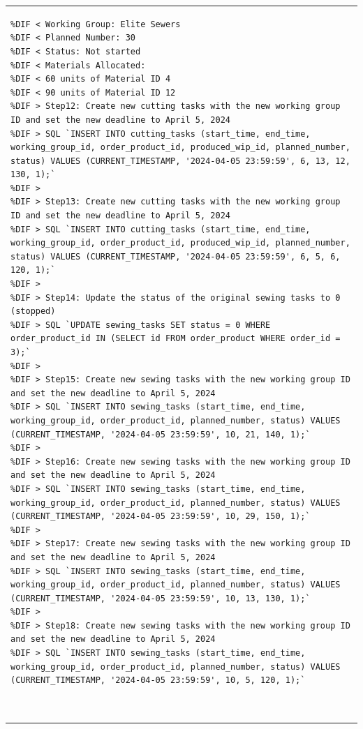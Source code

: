 \documentclass[preprint,12pt]{elsarticle}
\providecommand{\DIFmodbegin}{} %
\providecommand{\DIFmodend}{} %
\begin{document}
\begin{center}
\begin{longtable}{p{390pt}}
\begin{lstlisting}[style=my_operation, label={lst:chain_of_operation},alsolanguage=DIFcode]
%DIF < Task ID: 97
%DIF < Working Group: Elite Sewers
%DIF < Planned Number: 30
%DIF < Status: Not started
%DIF < Materials Allocated:
%DIF < 60 units of Material ID 4
%DIF < 90 units of Material ID 12
%DIF > Step12: Create new cutting tasks with the new working group ID and set the new deadline to April 5, 2024
%DIF > SQL `INSERT INTO cutting_tasks (start_time, end_time, working_group_id, order_product_id, produced_wip_id, planned_number, status) VALUES (CURRENT_TIMESTAMP, '2024-04-05 23:59:59', 6, 13, 12, 130, 1);`
%DIF > 
%DIF > Step13: Create new cutting tasks with the new working group ID and set the new deadline to April 5, 2024
%DIF > SQL `INSERT INTO cutting_tasks (start_time, end_time, working_group_id, order_product_id, produced_wip_id, planned_number, status) VALUES (CURRENT_TIMESTAMP, '2024-04-05 23:59:59', 6, 5, 6, 120, 1);`
%DIF > 
%DIF > Step14: Update the status of the original sewing tasks to 0 (stopped)
%DIF > SQL `UPDATE sewing_tasks SET status = 0 WHERE order_product_id IN (SELECT id FROM order_product WHERE order_id = 3);`
%DIF > 
%DIF > Step15: Create new sewing tasks with the new working group ID and set the new deadline to April 5, 2024
%DIF > SQL `INSERT INTO sewing_tasks (start_time, end_time, working_group_id, order_product_id, planned_number, status) VALUES (CURRENT_TIMESTAMP, '2024-04-05 23:59:59', 10, 21, 140, 1);`
%DIF > 
%DIF > Step16: Create new sewing tasks with the new working group ID and set the new deadline to April 5, 2024
%DIF > SQL `INSERT INTO sewing_tasks (start_time, end_time, working_group_id, order_product_id, planned_number, status) VALUES (CURRENT_TIMESTAMP, '2024-04-05 23:59:59', 10, 29, 150, 1);`
%DIF > 
%DIF > Step17: Create new sewing tasks with the new working group ID and set the new deadline to April 5, 2024
%DIF > SQL `INSERT INTO sewing_tasks (start_time, end_time, working_group_id, order_product_id, planned_number, status) VALUES (CURRENT_TIMESTAMP, '2024-04-05 23:59:59', 10, 13, 130, 1);`
%DIF > 
%DIF > Step18: Create new sewing tasks with the new working group ID and set the new deadline to April 5, 2024
%DIF > SQL `INSERT INTO sewing_tasks (start_time, end_time, working_group_id, order_product_id, planned_number, status) VALUES (CURRENT_TIMESTAMP, '2024-04-05 23:59:59', 10, 5, 120, 1);`
\end{lstlisting}
\DIFmodend\\ 
\DIFmodbegin
\begin{lstlisting}[style=my_operation, label={lst:chain_of_operation},alsolanguage=DIFcode]
%DIF > Step19: Check material inventory for required materials

\end{lstlisting}
\end{longtable}
\end{center}
\end{document}
